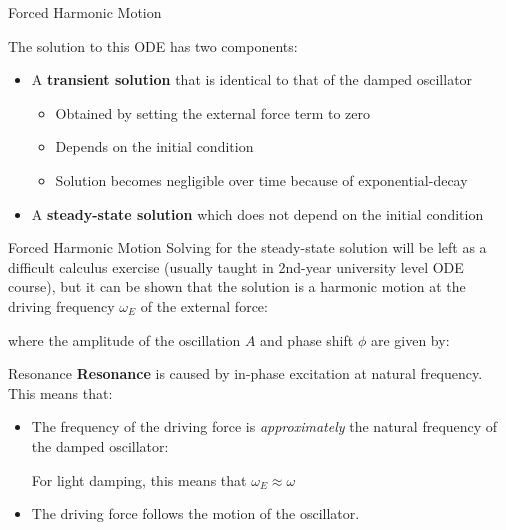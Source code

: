 \documentclass[12pt,compress,aspectratio=169]{beamer}
\begin{document}
\begin{frame}{Forced Harmonic Motion}
  
  The solution to this ODE has two components:
  \begin{itemize}
  \item A \textbf{transient solution} that is identical to that of the damped
    oscillator
    \begin{itemize}
    \item Obtained by setting the external force term to zero
    \item Depends on the initial condition
    \item Solution becomes negligible over time because of exponential-decay
    \end{itemize}
  \item A \textbf{steady-state solution} which does not depend on the initial
    condition
  \end{itemize}
\end{frame}



\begin{frame}{Forced Harmonic Motion}
  Solving for the steady-state solution will be left as a difficult calculus
  exercise (usually taught in 2nd-year university level ODE course), but it can
  be shown that the solution is a harmonic motion at the driving frequency
  $\omega_E$ of the external force:

  
  \vspace{-.1in}where the amplitude of the oscillation $A$ and phase shift
  $\phi$ are given by:

\end{frame}



\begin{frame}{Resonance}
  \textbf{Resonance} is caused by in-phase excitation at natural frequency.
  This means that:
  \begin{itemize}
  \item The frequency of the driving force is \emph{approximately} the natural
    frequency of the damped oscillator:


    For light damping, this means that $\omega_E\approx\omega$
    
  \item The driving force follows the motion of the oscillator.
  \end{itemize}
\end{frame}
\end{document}
